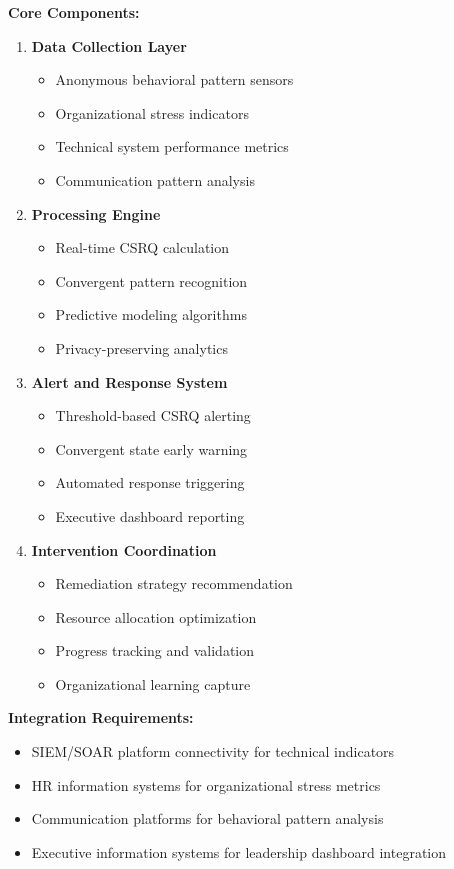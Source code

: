 \documentclass[11pt,a4paper]{article}
\begin{document}
\textbf{Core Components:}
\begin{enumerate}
\item \textbf{Data Collection Layer}
   \begin{itemize}
   \item Anonymous behavioral pattern sensors
   \item Organizational stress indicators
   \item Technical system performance metrics
   \item Communication pattern analysis
   \end{itemize}

\item \textbf{Processing Engine}
   \begin{itemize}
   \item Real-time CSRQ calculation
   \item Convergent pattern recognition
   \item Predictive modeling algorithms
   \item Privacy-preserving analytics
   \end{itemize}

\item \textbf{Alert and Response System}
   \begin{itemize}
   \item Threshold-based CSRQ alerting
   \item Convergent state early warning
   \item Automated response triggering
   \item Executive dashboard reporting
   \end{itemize}

\item \textbf{Intervention Coordination}
   \begin{itemize}
   \item Remediation strategy recommendation
   \item Resource allocation optimization
   \item Progress tracking and validation
   \item Organizational learning capture
   \end{itemize}
\end{enumerate}

\textbf{Integration Requirements:}
\begin{itemize}
\item SIEM/SOAR platform connectivity for technical indicators
\item HR information systems for organizational stress metrics
\item Communication platforms for behavioral pattern analysis
\item Executive information systems for leadership dashboard integration
\end{itemize}
\end{document}
